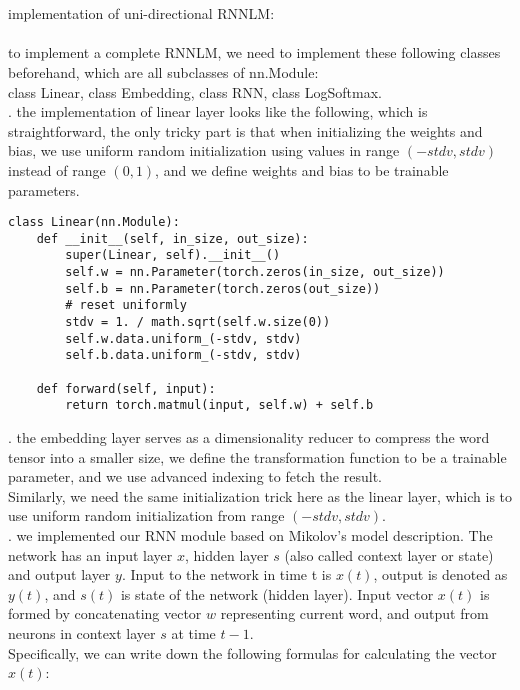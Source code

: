 \documentclass[11pt]{article}
\begin{document}
\part{}
\Large implementation of uni-directional RNNLM:\\
\\
\normalsize \indent to implement a complete RNNLM, we need to implement these following classes beforehand, which are all subclasses of nn.Module:\\
\indent class Linear, class Embedding, class RNN, class LogSoftmax.\\
. the implementation of linear layer looks like the following, which is straightforward, the only tricky part is that when initializing the weights and bias, we use uniform random initialization using values in range $(-stdv, stdv)$ instead of range $(0,1)$, and we define weights and bias to be trainable parameters.
\begin{lstlisting}
class Linear(nn.Module):
    def __init__(self, in_size, out_size):
        super(Linear, self).__init__()
        self.w = nn.Parameter(torch.zeros(in_size, out_size))
        self.b = nn.Parameter(torch.zeros(out_size))
        # reset uniformly
        stdv = 1. / math.sqrt(self.w.size(0))
        self.w.data.uniform_(-stdv, stdv)
        self.b.data.uniform_(-stdv, stdv)

    def forward(self, input):
        return torch.matmul(input, self.w) + self.b
\end{lstlisting}
\leavevmode
\newline
{}. the embedding layer serves as a dimensionality reducer to compress the word tensor into a smaller size, we define the transformation function to be a trainable parameter, and we use advanced indexing to fetch the result.\\
\indent Similarly, we need the same initialization trick here as the linear layer, which is to use uniform random initialization from range $(-stdv, stdv)$.\\
. we implemented our RNN module based on Mikolov's model description. The network has an input layer $x$, hidden layer $s$ (also called context layer or state) and output layer $y$. Input to the network in time t is $x(t)$, output is denoted as $y(t)$, and $s(t)$ is state of the network (hidden layer). Input vector $x(t)$ is formed by concatenating vector $w$ representing current word, and output from neurons in context layer $s$ at time $t-1$.\\
\indent Specifically, we can write down the following formulas for calculating the vector $x(t)$:
\end{document}
